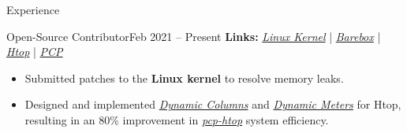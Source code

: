 \documentclass[]{Sohaib-Mohamed}
\begin{document}
\begin{cvsection}{Experience}
	\begin{cvsubsection}{Open-Source Contributor}{}{Feb 2021 -- Present}
      \textbf{Links:} \href{https://git.kernel.org/pub/scm/linux/kernel/git/next/linux-next.git/log/?qt=grep&q=sohaib}{\textit{Linux Kernel}} | \href{https://github.com/barebox/barebox/commits?author=smalinux}{\textit{Barebox}} | \href{https://github.com/htop-dev/htop/commits?author=smalinux}{\textit{Htop}} | \href{https://github.com/performancecopilot/pcp/commits?author=smalinux}{\textit{PCP}}
      \begin{itemize}
         \item Submitted patches to the \textbf{Linux kernel} to resolve memory leaks.
         \item Designed and implemented \href{https://github.com/htop-dev/htop/pull/707}{\textit{Dynamic Columns}} and \href{https://github.com/htop-dev/htop/pull/669}{\textit{Dynamic Meters}} for Htop, resulting in an 80\% improvement in \href{https://man.archlinux.org/man/pcp-htop.1.en}{\textit{pcp-htop}} system efficiency.
      \end{itemize}
   \end{cvsubsection}
\end{cvsection}
\end{document}
